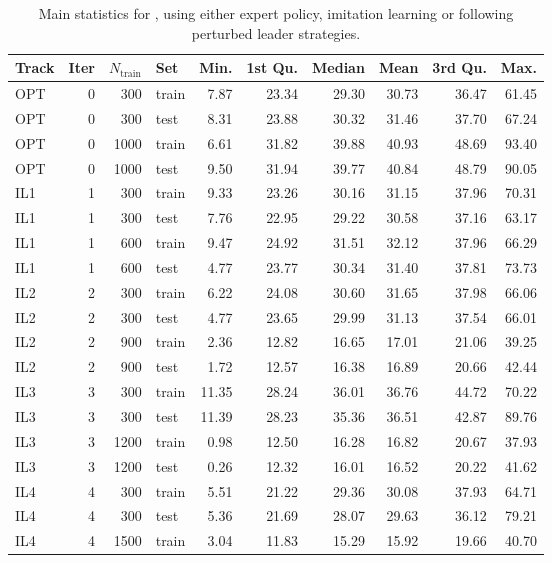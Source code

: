 \begin{table}[ht]
\caption{Main statistics for  \namerho, using either expert
   policy, imitation learning or following perturbed leader 
   strategies.}\label{tbl:il:stats} 
\centering
\begin{tabular}{lrrlrrrrrr}
  \toprule
  Track & Iter & $N_{\text{train}}$ & Set & Min. & 1st Qu. & Median & Mean & 
  3rd Qu. & Max. \\ 
  \midrule
  OPT & 0 & 300 & train & 7.87 & 23.34 & 29.30 & 30.73 & 36.47 & 61.45 \\ 
  OPT & 0 & 300 & test & 8.31 & 23.88 & 30.32 & 31.46 & 37.70 & 67.24 \\ 
  OPT & 0 & 1000 & train & 6.61 & 31.82 & 39.88 & 40.93 & 48.69 & 93.40 \\ 
  OPT & 0 & 1000 & test & 9.50 & 31.94 & 39.77 & 40.84 & 48.79 & 90.05 \\ 
  IL1 & 1 & 300 & train & 9.33 & 23.26 & 30.16 & 31.15 & 37.96 & 70.31 \\ 
  IL1 & 1 & 300 & test & 7.76 & 22.95 & 29.22 & 30.58 & 37.16 & 63.17 \\ 
  IL1 & 1 & 600 & train & 9.47 & 24.92 & 31.51 & 32.12 & 37.96 & 66.29 \\ 
  IL1 & 1 & 600 & test & 4.77 & 23.77 & 30.34 & 31.40 & 37.81 & 73.73 \\ 
  IL2 & 2 & 300 & train & 6.22 & 24.08 & 30.60 & 31.65 & 37.98 & 66.06 \\ 
  IL2 & 2 & 300 & test & 4.77 & 23.65 & 29.99 & 31.13 & 37.54 & 66.01 \\ 
  IL2 & 2 & 900 & train & 2.36 & 12.82 & 16.65 & 17.01 & 21.06 & 39.25 \\ 
  IL2 & 2 & 900 & test & 1.72 & 12.57 & 16.38 & 16.89 & 20.66 & 42.44 \\ 
  IL3 & 3 & 300 & train & 11.35 & 28.24 & 36.01 & 36.76 & 44.72 & 70.22 \\ 
  IL3 & 3 & 300 & test & 11.39 & 28.23 & 35.36 & 36.51 & 42.87 & 89.76 \\ 
  IL3 & 3 & 1200 & train & 0.98 & 12.50 & 16.28 & 16.82 & 20.67 & 37.93 \\ 
  IL3 & 3 & 1200 & test & 0.26 & 12.32 & 16.01 & 16.52 & 20.22 & 41.62 \\ 
  IL4 & 4 & 300 & train & 5.51 & 21.22 & 29.36 & 30.08 & 37.93 & 64.71 \\ 
  IL4 & 4 & 300 & test & 5.36 & 21.69 & 28.07 & 29.63 & 36.12 & 79.21 \\ 
  IL4 & 4 & 1500 & train & 3.04 & 11.83 & 15.29 & 15.92 & 19.66 & 40.70 \\ 

\end{tabular}
\end{table}
